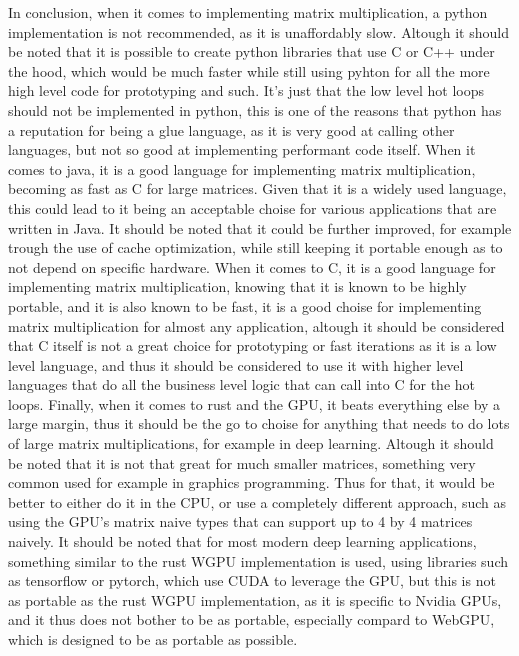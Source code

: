 \documentclass{article}
\begin{document}
In conclusion, when it comes to implementing matrix multiplication,
a python implementation is not recommended, as it is unaffordably slow.
Altough it should be noted that it is possible to create python libraries
that use C or C++ under the hood, which would be much faster while still
using pyhton for all the more high level code for prototyping and such.
It's just that the low level hot loops should not be implemented in python,
this is one of the reasons that python has a reputation for being a glue language,
as it is very good at calling other languages, but not so good at implementing
performant code itself.
When it comes to java, it is a good language for implementing matrix multiplication,
becoming as fast as C for large matrices. Given that it is a widely used language,
this could lead to it being an acceptable choise for various applications that
are written in Java. It should be noted that it could be further improved, for example
trough the use of cache optimization, while still keeping it portable enough as to not
depend on specific hardware.
When it comes to C, it is a good language for implementing matrix multiplication,
knowing that it is known to be highly portable, and it is also known to be fast,
it is a good choise for implementing matrix multiplication for almost any application,
altough it should be considered that C itself is not a great choice for
prototyping or fast iterations as it is a low level language, and thus it should be
considered to use it with higher level languages that do all the business level
logic that can call into C for the hot loops.
Finally, when it comes to rust and the GPU,
it beats everything else by a large margin, thus it should be the go to choise for
anything that needs to do lots of large matrix multiplications, for example in
deep learning. Altough it should be noted that it is not that great
for much smaller matrices, something very common used for example in graphics
programming.
Thus for that, it would be better to either do it in the CPU,
or use a completely different approach, such as using the GPU's matrix naive types that can support up to 4 by 4 matrices naively.
It should be noted that for most modern deep learning applications,
something similar to the rust WGPU implementation is used,
using libraries such as tensorflow or pytorch, which use CUDA
to leverage the GPU, but this is not as portable as the rust WGPU implementation,
as it is specific to Nvidia GPUs, and it thus does not
bother to be as portable, especially compard to WebGPU, which is designed to be as portable as possible.
\end{document}
